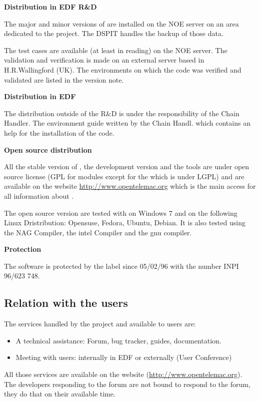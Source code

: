 \textbf{Distribution in EDF R\&D}

The major and minor versions of \telemacsystem are installed on the NOE server on an
area dedicated to the project. The DSPIT handles the backup of those data.

The test cases are available (at least in reading) on the NOE server. The
validation and verification is made on an external server based in
H.R.Wallingford (UK). The environments on which the code was verified and
validated are listed in the version note.

\textbf{Distribution in EDF}

The distribution outside of the R\&D is under the responsibility of the \telemacsystem
Chain Handler. The environment guide written by the Chain Handl. which
contains an help for the installation of the code.

\textbf{Open source distribution}

All the stable version of \telemacsystem, the development version and the tools are
under open source license (GPL for \telemacsystem modules except for the \bief which is
under LGPL) and are available on the website \url{http://www.opentelemac.org}
which is the main access for all information about \telemacsystem.

The open source version are tested with on Windows 7 and on the following Linux
Dristribution: Opensuse, Fedora, Ubuntu, Debian. It is also tested using the
NAG Compiler, the intel Compiler and the gnu compiler.

\textbf{Protection}

The software is protected by the label \tel since 05/02/96 with the number
INPI 96/623 748.

\subsection{Relation with the \telemacsystem users}

The services handled by the \telemacsystem project and available to users are:
\begin{itemize}
\item A technical assistance: Forum, bug tracker, guides, documentation.
\item Meeting with users: internally in EDF or externally (User Conference)
\end{itemize}

All those services are available on the \telemacsystem website
(\url{http://www.opentelemac.org}). 
The developers responding to the forum are not bound to respond to the forum,
they do that on their available time.


